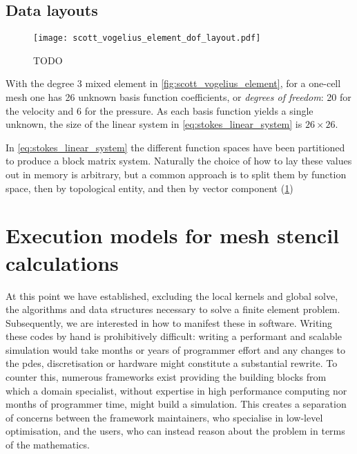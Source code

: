 \documentclass[thesis]{subfiles}
\begin{document}

\subsection{Data layouts}

\begin{figure}
  \centering
  \texttt{[image: scott\_vogelius\_element\_dof\_layout.pdf]}
  \caption{TODO}
  \label{fig:scott_vogelius_element_dof_layout}
\end{figure}

With the degree 3 mixed element in \cref{fig:scott_vogelius_element}, for a one-cell mesh one has 26 unknown basis function coefficients, or \textit{degrees of freedom}: 20 for the velocity and 6 for the pressure.
As each basis function yields a single unknown, the size of the linear system in \cref{eq:stokes_linear_system} is $26 \times 26$.

In \cref{eq:stokes_linear_system} the different function spaces have been partitioned to produce a block matrix system.
Naturally the choice of how to lay these values out in memory is arbitrary, but a common approach is to split them by function space, then by topological entity, and then by vector component (\cref{fig:scott_vogelius_element_dof_layout})

\section{Execution models for mesh stencil calculations}


At this point we have established, excluding the local kernels and global solve, the algorithms and data structures necessary to solve a finite element problem.
Subsequently, we are interested in how to manifest these in software.
Writing these codes by hand is prohibitively difficult: writing a performant and scalable simulation would take months or years of programmer effort and any changes to the \glspl{pde}, discretisation or hardware might constitute a substantial rewrite.
To counter this, numerous frameworks exist providing the building blocks from which a domain specialist, without expertise in high performance computing nor months of programmer time, might build a simulation.
This creates a separation of concerns between the framework maintainers, who specialise in low-level optimisation, and the users, who can instead reason about the problem in terms of the mathematics.
\end{document}
